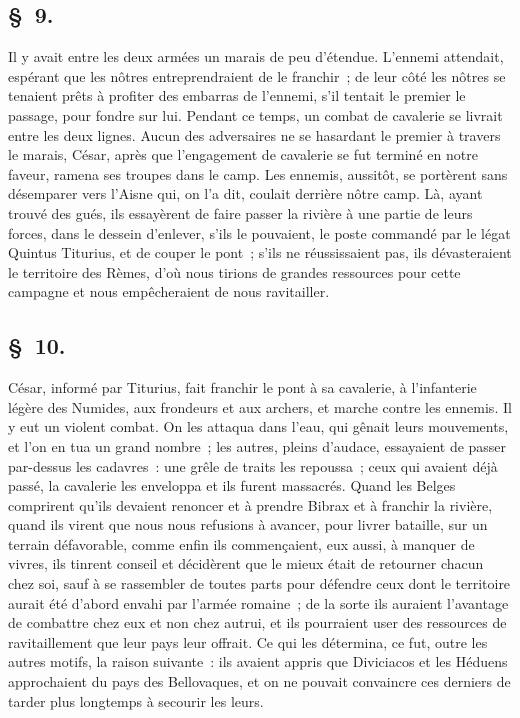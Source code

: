\documentclass[french,twoside]{book} %
\begin{document}
\subsection[{§ 9.}]{ \textsc{§ 9.} }
\noindent Il y avait entre les deux armées un marais de peu d’étendue. L'ennemi attendait, espérant que les nôtres entreprendraient de le franchir ; de leur côté les nôtres se tenaient prêts à profiter des embarras de l’ennemi, s’il tentait le premier le passage, pour fondre sur lui. Pendant ce temps, un combat de cavalerie se livrait entre les deux lignes. Aucun des adversaires ne se hasardant le premier à travers le marais, César, après que l’engagement de cavalerie se fut terminé en notre faveur, ramena ses troupes dans le camp. Les ennemis, aussitôt, se portèrent sans désemparer vers l’Aisne qui, on l’a dit, coulait derrière nôtre camp. Là, ayant trouvé des gués, ils essayèrent de faire passer la rivière à une partie de leurs forces, dans le dessein d’enlever, s’ils le pouvaient, le poste commandé par le légat Quintus Titurius, et de couper le pont ; s’ils ne réussissaient pas, ils dévasteraient le territoire des Rèmes, d’où nous tirions de grandes ressources pour cette campagne et nous empêcheraient de nous ravitailler.
\subsection[{§ 10.}]{ \textsc{§ 10.} }
\noindent César, informé par Titurius, fait franchir le pont à sa cavalerie, à l’infanterie légère des Numides, aux frondeurs et aux archers, et marche contre les ennemis. Il y eut un violent combat. On les attaqua dans l’eau, qui gênait leurs mouvements, et l’on en tua un grand nombre ; les autres, pleins d’audace, essayaient de passer par-dessus les cadavres : une grêle de traits les repoussa ; ceux qui avaient déjà passé, la cavalerie les enveloppa et ils furent massacrés. Quand les Belges comprirent qu’ils devaient renoncer et à prendre Bibrax et à franchir la rivière, quand ils virent que nous nous refusions à avancer, pour livrer bataille, sur un terrain défavorable, comme enfin ils commençaient, eux aussi, à manquer de vivres, ils tinrent conseil et décidèrent que le mieux était de retourner chacun chez soi, sauf à se rassembler de toutes parts pour défendre ceux dont le territoire aurait été d’abord envahi par l’armée romaine ; de la sorte ils auraient l’avantage de combattre chez eux et non chez autrui, et ils pourraient user des ressources de ravitaillement que leur pays leur offrait. Ce qui les détermina, ce fut, outre les autres motifs, la raison suivante : ils avaient appris que Diviciacos et les Héduens approchaient du pays des Bellovaques, et on ne pouvait convaincre ces derniers de tarder plus longtemps à secourir les leurs.
\end{document}
